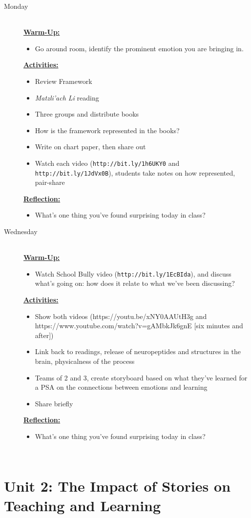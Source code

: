 \documentclass{article}
\newcommand{\tabbreak}{\begin{center}\faAsterisk\faAsterisk\faAsterisk\\\end{center}}
\newcommand{\url}[1]{\footnotesize\texttt{#1}\normalsize}
\newcommand{\listmon}{\item[\large\textsf{Monday}\normalsize] \hfill \\}
\newcommand{\listwed}{\item[\large\textsf{Wednesday}\normalsize] \hfill \\}
\newenvironment{daywu}
	{\underline{\textbf{Warm-Up:}} \hfill \\
	\begin{itemize}}
	{\end{itemize}}
\newenvironment{dayact}
	{\underline{\textbf{Activities:}} \hfill \\
	\begin{itemize}}
	{\end{itemize}}
\newenvironment{dayref}
	{\underline{\textbf{Reflection:}} \hfill \\
	\begin{itemize}}
	{\end{itemize}}
\newenvironment{weeksched}
	{\noindent
	\begin{description}}
	{\end{description}
	\newpage}
\begin{document}
\begin{weeksched}

\listmon
\begin{daywu}
	\item Go around room, identify the prominent emotion you are bringing in.
\end{daywu}
\begin{dayact}
	\item Review Framework
	\item \textit{Matzli'ach Li} reading
	\item Three groups and distribute books
	\item How is the framework represented in the books?
	\item Write on chart paper, then share out
	\item Watch each video (\url{http://bit.ly/1h6UKY0} and \url{http://bit.ly/1JdVx0B}), students take notes on how represented, pair-share
\end{dayact}
\begin{dayref}
	\item What's one thing you've found surprising today in class?
\end{dayref}

\listwed
\begin{daywu}
	\item Watch School Bully video (\url{http://bit.ly/1EcBIda}), and discuss what's going on: how does it relate to what we've been discussing?
\end{daywu}
\begin{dayact}
	\item Show both videos (https://youtu.be/xNY0AAUtH3g and https://www.youtube.com/watch?v=gAMbkJk6gnE [six minutes and after])
	\item Link back to readings, release of neuropeptides and structures in the brain, physicalness of the process
	\item Teams of 2 and 3, create storyboard based on what they've learned for a PSA on the connections between emotions and learning
	\item Share briefly
\end{dayact}
\begin{dayref}
	\item What's one thing you've found surprising today in class?
\end{dayref}
\end{weeksched}

\tabbreak

\section{Unit 2: The Impact of Stories on Teaching and Learning}
\end{document}
